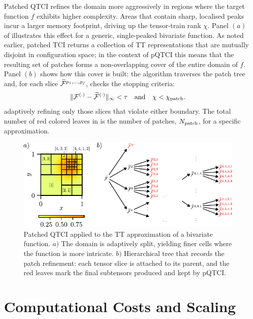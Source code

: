 Patched QTCI refines the domain more aggressively in regions where the target function $f$ exhibits higher complexity. Areas that contain sharp, localised peaks incur a larger memory footprint, driving up the tensor-train rank $\chi$. Panel $(a)$ of  illustrates this effect for a generic, single-peaked bivariate function. As noted earlier, patched TCI returns a collection of TT representations that are mutually disjoint in configuration space; in the context of pQTCI this means that the resulting set of patches forms a non-overlapping cover of the entire domain of $f$. Panel $(b)$ shows how this cover is built: the algorithm traverses the patch tree and, for each slice $\widetilde{\mathcal{F}}^{p_1,\dots,p_{\bar\ell}}$, checks the stopping criteria: 
\begin{equation}
	\| \mathcal{F}^{(\cdot)} - \widetilde{\mathcal{F}}^{(\cdot)} \|_{\infty} < \tau \quad \text{and} \quad \chi < \chi_{\text{patch}}.
	\label{eq:patchConvergence}
\end{equation}
adaptively refining only those slices that violate either boundary. The total number of red colored leaves in  is the number of patches, $N_{\text{patch}}$, for a specific approximation.
\begin{figure}[ht!]
	\includegraphics{figures/PatchingTree.pdf}
	\caption{Patched QTCI applied to the TT approximation of a bivariate function. $a)$ The domain is adaptively split, yielding finer cells where the function is more intricate. $b)$ Hierarchical tree that records the patch refinement: each tensor slice is attached to its parent, and the red leaves mark the final subtensors produced and kept by pQTCI. }
	\label{fig:patchTree}
\end{figure}

\section{Computational Costs and Scaling}
\label{sec:patchingCost}


